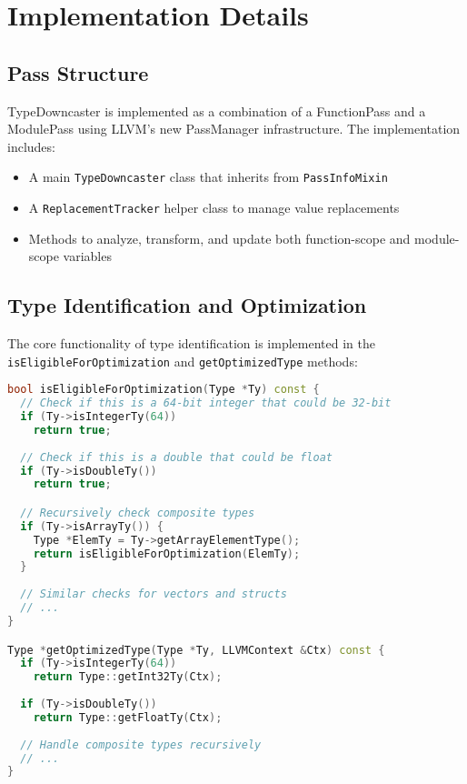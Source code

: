 \documentclass[conference]{IEEEtran}
\begin{document}
\section{Implementation Details}
\subsection{Pass Structure}
TypeDowncaster is implemented as a combination of a FunctionPass and a ModulePass using LLVM's new PassManager infrastructure. The implementation includes:

\begin{itemize}
    \item A main \texttt{TypeDowncaster} class that inherits from \texttt{PassInfoMixin}
    \item A \texttt{ReplacementTracker} helper class to manage value replacements
    \item Methods to analyze, transform, and update both function-scope and module-scope variables
\end{itemize}

\subsection{Type Identification and Optimization}
The core functionality of type identification is implemented in the \texttt{isEligibleForOptimization} and \texttt{getOptimizedType} methods:

\begin{lstlisting}[language=C++]
bool isEligibleForOptimization(Type *Ty) const {
  // Check if this is a 64-bit integer that could be 32-bit
  if (Ty->isIntegerTy(64))
    return true;
  
  // Check if this is a double that could be float
  if (Ty->isDoubleTy())
    return true;

  // Recursively check composite types
  if (Ty->isArrayTy()) {
    Type *ElemTy = Ty->getArrayElementType();
    return isEligibleForOptimization(ElemTy);
  }
  
  // Similar checks for vectors and structs
  // ...
}

Type *getOptimizedType(Type *Ty, LLVMContext &Ctx) const {
  if (Ty->isIntegerTy(64))
    return Type::getInt32Ty(Ctx);
  
  if (Ty->isDoubleTy())
    return Type::getFloatTy(Ctx);
  
  // Handle composite types recursively
  // ...
}
\end{lstlisting}
\end{document}

